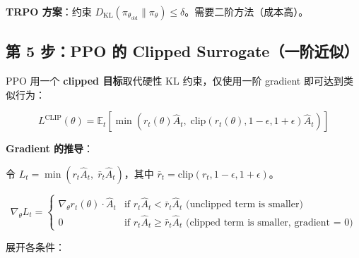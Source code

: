 \textbf{TRPO 方案}：约束 $D_{\text{KL}}(\pi_{\theta_{\text{old}}} \| \pi_\theta) \leq \delta$。需要二阶方法（成本高）。

\subsection{第 5 步：PPO 的 Clipped Surrogate（一阶近似）}
\label{step-5-ppos-clipped-surrogate-first-order-approximation}

PPO 用一个\textbf{ clipped 目标}取代硬性 KL 约束，仅使用一阶 gradient 即可达到类似行为：

\begin{equation}
\boxed{L^{\text{CLIP}}(\theta) = \mathbb{E}_t\left[\min\!\left(r_t(\theta)\hat{A}_t,\;\text{clip}(r_t(\theta), 1{-}\epsilon, 1{+}\epsilon)\hat{A}_t\right)\right]}
\end{equation}

\textbf{Gradient 的推导}：

令 $L_t = \min(r_t \hat{A}_t,\; \bar{r}_t \hat{A}_t)$，其中 $\bar{r}_t = \text{clip}(r_t, 1{-}\epsilon, 1{+}\epsilon)$。

\begin{equation}
\nabla_\theta L_t = \begin{cases}
\nabla_\theta r_t(\theta) \cdot \hat{A}_t & \text{if } r_t \hat{A}_t < \bar{r}_t \hat{A}_t \text{ (unclipped term is smaller)} \\
0 & \text{if } r_t \hat{A}_t \geq \bar{r}_t \hat{A}_t \text{ (clipped term is smaller, gradient = 0)}
\end{cases}
\end{equation}

展开各条件：

